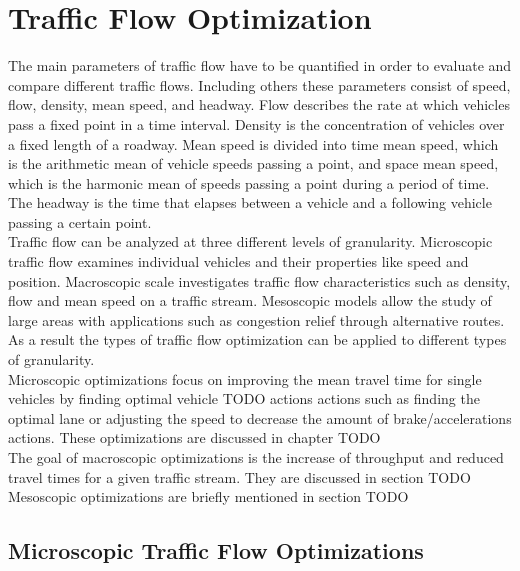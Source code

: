 \documentclass{sig-alternate}
\begin{document}
\section{Traffic Flow Optimization }
The main parameters of traffic flow have to be quantified in order to evaluate and compare different traffic flows. Including others these parameters consist of speed, flow, density, mean speed, and headway. Flow describes the rate at which vehicles pass a fixed point in a time interval. Density is the concentration of vehicles over a fixed length of a roadway. Mean speed is divided into time mean speed, which is the arithmetic mean of vehicle speeds passing a point, and space mean speed, which is the harmonic mean of speeds passing a point during a period of time. The headway is the time that elapses between a vehicle and a following vehicle passing a certain point. \\
Traffic flow can be analyzed at three different levels of granularity. Microscopic traffic flow examines individual vehicles and their properties like speed and position. Macroscopic scale investigates traffic flow characteristics such as density, flow and mean speed on a traffic stream. Mesoscopic models allow the study of large areas with applications such as congestion relief through alternative routes. \\
As a result the types of traffic flow optimization can be applied to different types of granularity. \\
Microscopic optimizations focus on improving the mean travel time for single vehicles by finding optimal vehicle TODO actions actions such as finding the optimal lane or adjusting the speed to decrease the amount of brake/accelerations actions. These optimizations are discussed in chapter TODO\\
The goal of macroscopic optimizations is the increase of throughput and reduced travel times for a given traffic stream. They are discussed in section TODO \\
Mesoscopic optimizations are briefly mentioned in section TODO\\

\subsection{Microscopic Traffic Flow Optimizations}
\label{microscopic}
\end{document}
